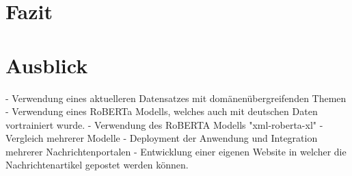 \chapter{Fazit}
\label{chap:fazit}


\chapter{Ausblick}
\label{chap:ausblick}

- Verwendung eines aktuelleren Datensatzes mit domänenübergreifenden Themen
- Verwendung eines RoBERTa Modells, welches auch mit deutschen Daten vortrainiert wurde.
- Verwendung des RoBERTA Modells "xml-roberta-xl"
- Vergleich mehrerer Modelle
- Deployment der Anwendung und Integration mehrerer Nachrichtenportalen
- Entwicklung einer eigenen Website in welcher die Nachrichtenartikel gepostet werden können.

